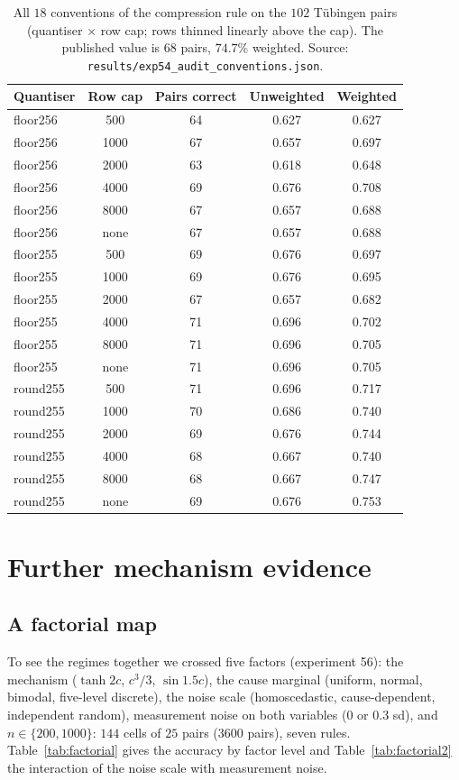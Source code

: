 \begin{table}[ht]
\caption{All $18$ conventions of the compression rule on the $102$ T\"ubingen pairs (quantiser $\times$ row cap; rows thinned linearly above the cap). The published value is $68$ pairs, $74.7\%$ weighted. Source: \texttt{results/exp54\_audit\_conventions.json}.}
\label{tab:grid18}
\small
\begin{tabular}{@{}lcccc@{}}
\toprule
Quantiser & Row cap & Pairs correct & Unweighted & Weighted\\
\midrule
floor256 & 500 & 64 & 0.627 & 0.627\\
floor256 & 1000 & 67 & 0.657 & 0.697\\
floor256 & 2000 & 63 & 0.618 & 0.648\\
floor256 & 4000 & 69 & 0.676 & 0.708\\
floor256 & 8000 & 67 & 0.657 & 0.688\\
floor256 & none & 67 & 0.657 & 0.688\\
floor255 & 500 & 69 & 0.676 & 0.697\\
floor255 & 1000 & 69 & 0.676 & 0.695\\
floor255 & 2000 & 67 & 0.657 & 0.682\\
floor255 & 4000 & 71 & 0.696 & 0.702\\
floor255 & 8000 & 71 & 0.696 & 0.705\\
floor255 & none & 71 & 0.696 & 0.705\\
round255 & 500 & 71 & 0.696 & 0.717\\
round255 & 1000 & 70 & 0.686 & 0.740\\
round255 & 2000 & 69 & 0.676 & 0.744\\
round255 & 4000 & 68 & 0.667 & 0.740\\
round255 & 8000 & 68 & 0.667 & 0.747\\
round255 & none & 69 & 0.676 & 0.753\\
\bottomrule
\end{tabular}
\end{table}

\section{Further mechanism evidence}\label{app:mech}
\subsection{A factorial map}\label{sec:factorial}
To see the regimes together we crossed five factors (experiment 56): the mechanism ($\tanh 2c$, $c^3/3$, $\sin 1.5c$), the cause marginal (uniform, normal, bimodal, five-level discrete), the noise scale (homoscedastic, cause-dependent, independent random), measurement noise on both variables ($0$ or $0.3$ sd), and $n\in\{200,1000\}$: $144$ cells of $25$ pairs ($3600$ pairs), seven rules. Table~\ref{tab:factorial} gives the accuracy by factor level and Table~\ref{tab:factorial2} the interaction of the noise scale with measurement noise.

